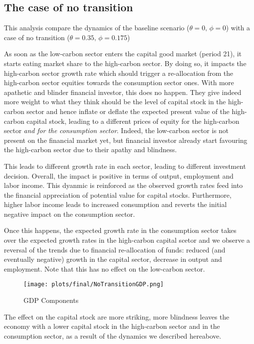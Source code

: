 \documentclass[]{article}
\begin{document}
\subsection{The case of no transition}\label{the-case-of-no-transition}

This analysis compare the dynamics of the baseline scenario
(\(\theta=0, \,\phi=0\)) with a case of no transition
(\(\theta=0.35, \, \phi=0.175\))

As soon as the low-carbon sector enters the capital good market (period
21), it starts eating market share to the high-carbon sector. By doing
so, it impacts the high-carbon sector growth rate which should trigger a
re-allocation from the high-carbon sector equities towards the
consumption sector ones. With more apathetic and blinder financial
investor, this does no happen. They give indeed more weight to what they
think should be the level of capital stock in the high-carbon sector and
hence inflate or deflate the expected present value of the high-carbon
capital stock, leading to a different prices of equity for the
high-carbon sector \emph{and for the consumption sector}. Indeed, the
low-carbon sector is not present on the financial market yet, but
financial investor already start favouring the high-carbon sector due to
their apathy and blindness.

This leads to different growth rate in each sector, leading to different
investment decision. Overall, the impact is positive in terms of output,
employment and labor income. This dyanmic is reinforced as the observed
growth rates feed into the financial appreciation of potential value for
capital stocks. Furthermore, higher labor income leads to increased
consumption and reverts the initial negative impact on the consumption
sector.

Once this happens, the expected growth rate in the consumption sector
takes over the expected growth rates in the high-carbon capital scetor
and we observe a reversal of the trends due to financial re-allocation
of funds: reduced (and eventually negative) growth in the capital
sector, decrease in output and employment. Note that this has no effect
on the low-carbon sector.

\begin{figure}[htbp]
\centering
\texttt{[image: plots/final/NoTransitionGDP.png]}
\caption{GDP Components}
\end{figure}

The effect on the capital stock are more striking, more blindness leaves
the economy with a lower capital stock in the high-carbon sector and in
the consumption sector, as a result of the dynamics we described
hereabove.
\end{document}
